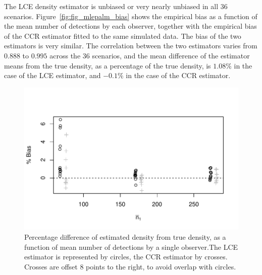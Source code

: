 \documentclass[useAMS, usenatbib, referee]{biom}\usepackage[]{graphicx}\usepackage[]{color}
\makeatletter
\def\maxwidth{ %
  \ifdim\Gin@nat@width>\linewidth
    \linewidth
  \else
    \Gin@nat@width
  \fi
}
\newenvironment{knitrout}{}{} %
\makeatother
\begin{document}
The LCE density estimator is unbiased or very nearly unbiased  in all 36 scenarios. Figure~\ref{fig:fig_mlepalm_bias} shows the empirical bias as a function of the mean number of detections by each observer, together with the empirical bias of the CCR estimator fitted to the same simulated data. The bias of the two estimators is very similar. The correlation between the two estimators varies from $0.888$ to $0.995$ across the 36 scenarios, and the mean difference of the estimator means from the true density, as a percentage of the true density, is $1.08\%$ in the case of the LCE estimator, and $-0.1\%$ in the case of the CCR estimator.

\begin{knitrout}
\color{fgcolor}\begin{figure}

{\centering \includegraphics[width=\maxwidth]{figs/fig_mlepalm_bias_bcs-1} 

}

\caption[Percentage difference of estimated density from true density, as a function of mean number of detections by a single observer.The LCE estimator is represented by circles, the CCR estimator by crosses]{Percentage difference of estimated density from true density, as a function of mean number of detections by a single observer.The LCE estimator is represented by circles, the CCR estimator by crosses. Crosses are offset 8 points to the right, to avoid overlap with circles.}\label{fig:fig_mlepalm_bias_bcs}
\end{figure}


\end{knitrout}
\end{document}
